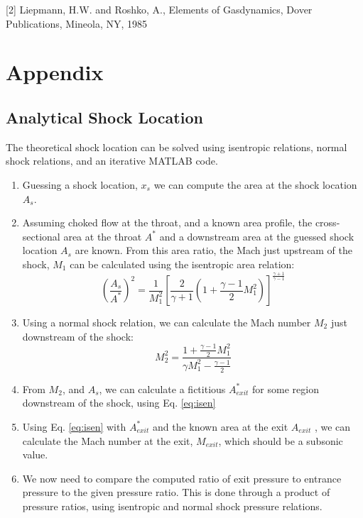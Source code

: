 \documentclass{article}%
\numberwithin{equation}{section}
\begin{document}
[2] Liepmann, H.W. and Roshko, A., Elements of Gasdynamics, Dover Publications, Mineola, NY, 1985


\section*{Appendix}
\subsection*{Analytical Shock Location}

The theoretical shock location can be solved using isentropic relations, normal shock relations, and an iterative MATLAB code.

\begin{enumerate}
\item Guessing a shock location, $ x_s $ we can compute the area at the shock location $ A_s $.
\item 
Assuming choked flow at the throat, and a known area profile, the cross-sectional area at the throat $ A^* $ and a downstream area at the guessed shock location $ A_s $ are known. From this area ratio, the Mach just upstream of the shock, $ M_1 $ can be calculated using the isentropic area relation:
\begin{equation} \label{eq:isen}
\left( \frac{A_s}{A^*}\right)^2=\frac{1}{M_1^2} \left[ \frac{2}{\gamma +1} \left(1+\frac{\gamma-1}{2} M_1^2 \right) \right]^{\frac{\gamma+1}{\gamma-1}}
\end{equation}

\item Using a normal shock relation, we can calculate the Mach number $ M_2 $ just downstream of the shock:
\begin{equation}
M_2^2=\frac{1+\frac{\gamma-1}{2}M_1^2}{\gamma M_1^2-\frac{\gamma-1}{2}}
\end{equation}


\item From $ M_2 $, and $ A_s $, we can calculate a fictitious $ A^*_{exit} $ for some region downstream of the shock, using Eq. \ref{eq:isen}

\item Using Eq. \ref{eq:isen} with $ A^*_{exit} $ and the known area at the exit $ A_{exit} $ , we can calculate the Mach number at the exit, $ M_{exit} $, which should be a subsonic value.

\item We now need to compare the computed ratio of exit pressure to entrance pressure to the given pressure ratio. This is done through a product of pressure ratios, using isentropic and normal shock pressure relations.


\end{enumerate}
\end{document}
